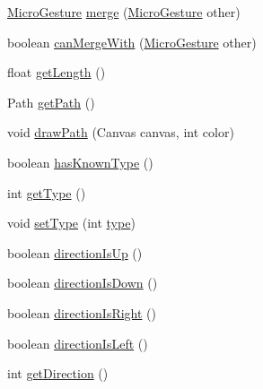 \begin{DoxyCompactItemize}
\item 
\hyperlink{classch_1_1zhaw_1_1ba10__bsha__1_1_1service_1_1MicroGesture}{MicroGesture} \hyperlink{classch_1_1zhaw_1_1ba10__bsha__1_1_1service_1_1MicroGesture_a363ee314636824c156497dd7138edaa9}{merge} (\hyperlink{classch_1_1zhaw_1_1ba10__bsha__1_1_1service_1_1MicroGesture}{MicroGesture} other)
\item 
boolean \hyperlink{classch_1_1zhaw_1_1ba10__bsha__1_1_1service_1_1MicroGesture_aa86fa9810f2f6155bf027c5c358861bd}{canMergeWith} (\hyperlink{classch_1_1zhaw_1_1ba10__bsha__1_1_1service_1_1MicroGesture}{MicroGesture} other)
\item 
float \hyperlink{classch_1_1zhaw_1_1ba10__bsha__1_1_1service_1_1MicroGesture_ad2000095a1aaed409721b5580382639f}{getLength} ()
\item 
Path \hyperlink{classch_1_1zhaw_1_1ba10__bsha__1_1_1service_1_1MicroGesture_a9640a018716e9a2ff309360071af6be7}{getPath} ()
\item 
void \hyperlink{classch_1_1zhaw_1_1ba10__bsha__1_1_1service_1_1MicroGesture_aa06eca44734c4df4bc13c1d045724904}{drawPath} (Canvas canvas, int color)
\item 
boolean \hyperlink{classch_1_1zhaw_1_1ba10__bsha__1_1_1service_1_1MicroGesture_a85e524f74a8ae04db9418ddecb835bcd}{hasKnownType} ()
\item 
int \hyperlink{classch_1_1zhaw_1_1ba10__bsha__1_1_1service_1_1MicroGesture_a010dd89f21ef5ac1ed012ae1f4b7e80e}{getType} ()
\item 
void \hyperlink{classch_1_1zhaw_1_1ba10__bsha__1_1_1service_1_1MicroGesture_ae7f33d544189f7cf99710d8694beec56}{setType} (int \hyperlink{classch_1_1zhaw_1_1ba10__bsha__1_1_1service_1_1MicroGesture_ac1ee8b835a0b20d0e3535682eb0d2741}{type})
\item 
boolean \hyperlink{classch_1_1zhaw_1_1ba10__bsha__1_1_1service_1_1MicroGesture_ac7b68d3f3a9efd30535baf0c60b9024f}{directionIsUp} ()
\item 
boolean \hyperlink{classch_1_1zhaw_1_1ba10__bsha__1_1_1service_1_1MicroGesture_af20c9c32f3b4f9924bffffc78b7697e6}{directionIsDown} ()
\item 
boolean \hyperlink{classch_1_1zhaw_1_1ba10__bsha__1_1_1service_1_1MicroGesture_a265dca7b768b336a90d0177b1a299949}{directionIsRight} ()
\item 
boolean \hyperlink{classch_1_1zhaw_1_1ba10__bsha__1_1_1service_1_1MicroGesture_a4d4320e029aef962577b2ccc85f2ee57}{directionIsLeft} ()
\item 
int \hyperlink{classch_1_1zhaw_1_1ba10__bsha__1_1_1service_1_1MicroGesture_a43e707803f3820e6f8cae56d1f1976b7}{getDirection} ()

\end{DoxyCompactItemize}

